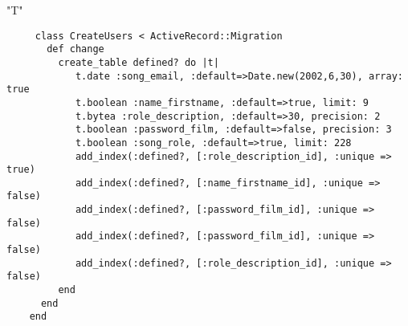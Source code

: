   "T"
	\begin{verbatim}
   	 class CreateUsers < ActiveRecord::Migration
	   def change
	     create_table defined? do |t|
			t.date :song_email, :default=>Date.new(2002,6,30), array: true
   			t.boolean :name_firstname, :default=>true, limit: 9
   			t.bytea :role_description, :default=>30, precision: 2
   			t.boolean :password_film, :default=>false, precision: 3
   			t.boolean :song_role, :default=>true, limit: 228
   			add_index(:defined?, [:role_description_id], :unique => true)
			add_index(:defined?, [:name_firstname_id], :unique => false)
			add_index(:defined?, [:password_film_id], :unique => false)
			add_index(:defined?, [:password_film_id], :unique => false)
			add_index(:defined?, [:role_description_id], :unique => false)
	     end
	  end 
    end
    \end{verbatim}
